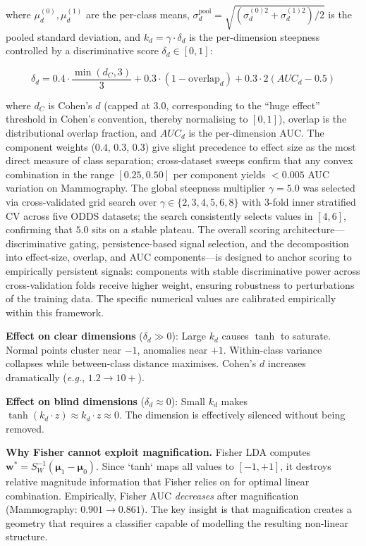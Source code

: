\documentclass[journal]{IEEEtran}
\newcommand{\eg}{\textit{e.g.}}
\begin{document}
where $\mu_d^{(0)}, \mu_d^{(1)}$ are the per-class means, $\sigma_d^{\text{pool}} = \sqrt{(\sigma_d^{(0)2} + \sigma_d^{(1)2})/2}$ is the pooled standard deviation, and $k_d = \gamma \cdot \delta_d$ is the per-dimension steepness controlled by a discriminative score $\delta_d \in [0, 1]$:

\begin{equation}
\delta_d = 0.4 \cdot \frac{\min(d_C, 3)}{3} + 0.3 \cdot (1 - \text{overlap}_d) + 0.3 \cdot 2(AUC_d - 0.5)
\label{eq:disc_score}
\end{equation}

where $d_C$ is Cohen's $d$ (capped at $3.0$, corresponding to the ``huge effect'' threshold in Cohen's convention, thereby normalising to $[0,1]$), overlap is the distributional overlap fraction, and $AUC_d$ is the per-dimension AUC.  The component weights ($0.4$, $0.3$, $0.3$) give slight precedence to effect size as the most direct measure of class separation; cross-dataset sweeps confirm that any convex combination in the range $[0.25, 0.50]$ per component yields $<0.005$ AUC variation on Mammography.  The global steepness multiplier $\gamma = 5.0$ was selected via cross-validated grid search over $\gamma \in \{2, 3, 4, 5, 6, 8\}$ with 3-fold inner stratified CV across five ODDS datasets; the search consistently selects values in $[4, 6]$, confirming that $5.0$ sits on a stable plateau.  The overall scoring architecture---discriminative gating, persistence-based signal selection, and the decomposition into effect-size, overlap, and AUC components---is designed to anchor scoring to empirically persistent signals: components with stable discriminative power across cross-validation folds receive higher weight, ensuring robustness to perturbations of the training data.  The specific numerical values are calibrated empirically within this framework.

\textbf{Effect on clear dimensions} ($\delta_d \gg 0$): Large $k_d$ causes $\tanh$ to saturate. Normal points cluster near $-1$, anomalies near $+1$. Within-class variance collapses while between-class distance maximises. Cohen's $d$ increases dramatically (\eg, $1.2 \to 10+$).

\textbf{Effect on blind dimensions} ($\delta_d \approx 0$): Small $k_d$ makes $\tanh(k_d \cdot z) \approx k_d \cdot z \approx 0$. The dimension is effectively silenced without being removed.

\textbf{Why Fisher cannot exploit magnification.} Fisher LDA computes $\mathbf{w}^* = S_W^{-1}(\boldsymbol{\mu}_1 - \boldsymbol{\mu}_0)$. Since `tanh` maps all values to $[-1, +1]$, it destroys relative magnitude information that Fisher relies on for optimal linear combination. Empirically, Fisher AUC \textit{decreases} after magnification (Mammography: $0.901 \to 0.861$). The key insight is that magnification creates a geometry that requires a classifier capable of modelling the resulting non-linear structure.
\end{document}
